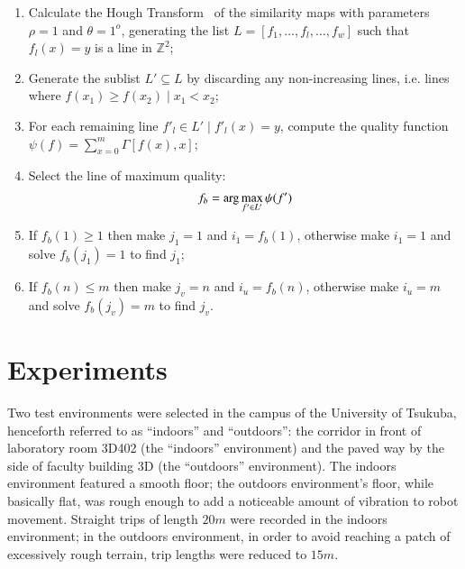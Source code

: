 \documentclass[twocolumn, 9pt,fleqn]{jsproceedings}
\begin{document}
\begin{enumerate}
\item Calculate the Hough Transform~\cite{DUD72} of the similarity maps with parameters $\rho = 1$ and $\theta = 1^o$, generating the list \mbox{$L = [f_1, \dotsc, f_l, \dotsc, f_w]$} such that $f_l(x) = y$ is a line in $\mathbb{Z}^2$;
\item Generate the sublist $L' \subseteq L$ by discarding any non-increasing lines, i.e. lines where $f(x_1) \geq f(x_2) \; | \; x_1 < x_2$;
\item For each remaining line $f'_l \in L' \; | \; f'_l(x) = y$, compute the quality function $\psi(f) = \sum_{x = 0}^{m} \Gamma[f(x), x]$;
\item Select the line of maximum quality:
\begin{equation}
f_b = \arg \max_{f' \in L'} {\psi(f')} \notag
\end{equation}
\item If $f_b(1) \geq 1$ then make $j_1 = 1$ and $i_1 = f_b(1)$, otherwise make $i_1 = 1$ and solve $f_b(j_1) = 1$ to find $j_1$;
\item If $f_b(n) \leq m$ then make $j_v = n$ and $i_u = f_b(n)$, otherwise make $i_u = m$ and solve $f_b(j_v) = m$ to find $j_v$.
\end{enumerate}

\section{Experiments}

Two test environments were selected in the campus of the University of Tsukuba, henceforth referred to as ``indoors'' and ``outdoors'': the corridor in front of laboratory room 3D402 (the ``indoors'' environment) and the paved way by the side of faculty building 3D (the ``outdoors'' environment). The indoors environment featured a smooth floor; the outdoors environment's floor, while basically flat, was rough enough to add a noticeable amount of vibration to robot movement. Straight trips of length $20m$ were recorded in the indoors environment; in the outdoors environment, in order to avoid reaching a patch of excessively rough terrain, trip lengths were reduced to $15m$.
\end{document}
